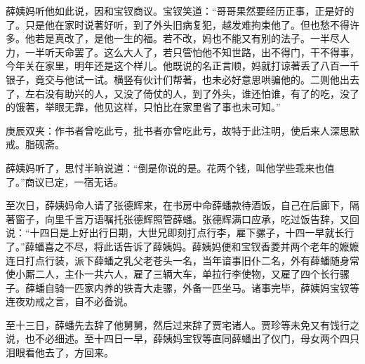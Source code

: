 \begin{parag}
    薛姨妈听他如此说，因和宝钗商议。宝钗笑道：“哥哥果然要经历正事，正是好的了。只是他在家时说著好听，到了外头旧病复犯，越发难拘束他了。但也愁不得许多。他若是真改了，是他一生的福。若不改，妈也不能又有别的法子。一半尽人力，一半听天命罢了。这么大人了，若只管怕他不知世路，出不得门，干不得事，今年关在家里，明年还是这个样儿。他既说的名正言顺，妈就打谅著丢了八百一千银子，竟交与他试一试。横竖有伙计们帮著，也未必好意思哄骗他的。二则他出去了，左右没有助兴的人，又没了倚仗的人，到了外头，谁还怕谁，有了的吃，没了的饿著，举眼无靠，他见这样，只怕比在家里省了事也未可知。”\begin{note}庚辰双夹：作书者曾吃此亏，批书者亦曾吃此亏，故特于此注明，使后来人深思默戒。脂砚斋。\end{note}薛姨妈听了，思忖半晌说道：“倒是你说的是。花两个钱，叫他学些乖来也值了。”商议已定，一宿无话。
\end{parag}


\begin{parag}
    至次日，薛姨妈命人请了张德辉来，在书房中命薛蟠款待酒饭，自己在后廊下，隔著窗子，向里千言万语嘱托张德辉照管薛蟠。张德辉满口应承，吃过饭告辞，又回说：“十四日是上好出行日期，大世兄即刻打点行李，雇下骡子，十四一早就长行了。”薛蟠喜之不尽，将此话告诉了薛姨妈。薛姨妈便和宝钗香菱并两个老年的嬷嬷连日打点行装，派下薛蟠之乳父老苍头一名，当年谙事旧仆二名，外有薛蟠随身常使小厮二人，主仆一共六人，雇了三辆大车，单拉行李使物，又雇了四个长行骡子。薛蟠自骑一匹家内养的铁青大走骡，外备一匹坐马。诸事完毕，薛姨妈宝钗等连夜劝戒之言，自不必备说。
\end{parag}


\begin{parag}
    至十三日，薛蟠先去辞了他舅舅，然后过来辞了贾宅诸人。贾珍等未免又有饯行之说，也不必细述。至十四日一早，薛姨妈宝钗等直同薛蟠出了仪门，母女两个四只泪眼看他去了，方回来。
\end{parag}


